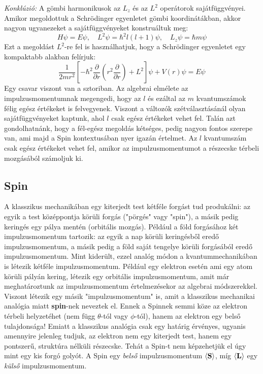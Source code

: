 \documentclass[../main.tex]{subfiles}
\begin{document}
\textit{Konklúzió:} A gömbi harmonikusok az $L_z$ és az $L^2$ operátorok sajátfüggvényei. Amikor megoldottuk a Schrödinger egyenletet gömbi koordinátákban,
akkor nagyon ugyanezeket a sajátfüggvényeket konstruáltuk meg:
\begin{equation}
    H\psi = E \psi, \quad L^2 \psi = \hbar^2 l (l + 1) \psi, \quad L_z \psi = \hbar m \psi
\end{equation}
Ezt a megoldást $L^2$-re fel is használhatjuk, hogy a Schrödinger egyenletet egy kompaktabb alakban felírjuk:
\begin{equation}
    \frac{1}{2mr^2} \left[-\hbar^2 \frac{\partial }{\partial r} \left(r^2 \frac{\partial}{\partial r}\right) + L^2 \right] \psi + V(r) \psi = E \psi
\end{equation}
Egy csavar viszont van a sztoriban. Az algebrai elmélete az impulzusmomentumnak megengedi, hogy az $l$ és ezáltal az $m$ kvantumszámok félig egész értékeket is felvegyenek. 
Viszont a változók szétválasztásánál olyan sajátfüggvényeket kaptunk, ahol $l$ csak egész értékeket vehet fel. Talán azt gondolhatnánk, hogy a fél-egész megoldás kétséges,
pedig nagyon fontos szerepe van, ami majd a Spin kontextusában nyer igazán értelmet. Az $l$ kvantumszám csak egész értékeket vehet fel, amikor az impulzusmomentumot a részecske térbeli mozgásából számoljuk ki.

\subsection{Spin}
A klasszikus mechanikában egy kiterjedt test kétféle forgást tud produkálni: az egyik a test középpontja körüli forgás ("pörgés" vagy "spin"), a másik pedig keringés egy pálya mentén (orbitális mozgás).
Például a föld forgásához két impulzusmomentum tartozik: az egyik a nap körüli keringésből eredő impulzusmomentum, a másik pedig a föld saját tengelye körüli forgásából eredő impulzusmomentum.
Mint kiderült, ezzel analóg módon a kvantummechanikában is létezik kétféle impulzusmomentum. Például egy elektron esetén ami egy atom körüli pályán kering, létezik egy orbitális impulzusmomentum,
amit már meghatároztunk az impulzusmomentum értelmezésekor az algebrai módszerekkel. Viszont létezik egy másik "impulzusmomentum" is, amit a klasszikus mechanikai analógia miatt \textbf{spin}-nek neveztek el.
Ennek a Spinnek semmi köze az elektron térbeli helyzetéhet (nem függ $\theta$-tól vagy $\phi$-tól), hanem az elektron egy belső tulajdonsága! Emiatt a klasszikus analógia csak egy határig érvényes,
ugyanis amennyire jelenleg tudjuk, az elektron nem egy kiterjedt test, hanem egy pontszerű, struktúra nélküli részecske. Tehát a Spin-t nem képzehetjük el úgy mint egy kis forgó golyót.
A Spin egy \textit{belső} impulzusmomentum $\langle \bold{S} \rangle$, míg $\langle \bold{L} \rangle$ egy \textit{külső} impulzusmomentum.
\end{document}
